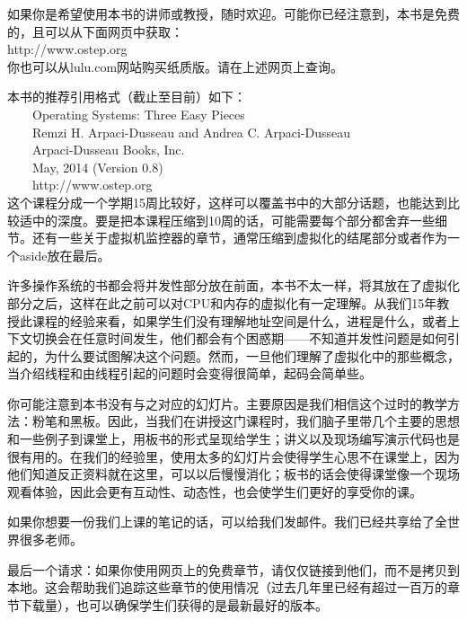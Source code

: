  \vspace*{0.0cm}
\thispagestyle{empty}
\centerline{}\vspace{2cm}

如果你是希望使用本书的讲师或教授，随时欢迎。可能你已经注意到，本书是免费的，且可以从下面网页中获取：\\
http://www.ostep.org\\
你也可以从lulu.com网站购买纸质版。请在上述网页上查询。

本书的推荐引用格式（截止至目前）如下：\\
~~~~Operating Systems: Three Easy Pieces\\
~~~~Remzi H. Arpaci-Dusseau and Andrea C. Arpaci-Dusseau\\
~~~~Arpaci-Dusseau Books, Inc.\\
~~~~May, 2014 (Version 0.8)\\
~~~~http://www.ostep.org\\

这个课程分成一个学期15周比较好，这样可以覆盖书中的大部分话题，也能达到比较适中的深度。要是把本课程压缩到10周的话，可能需要每个部分都舍弃一些细节。还有一些关于虚拟机监控器的章节，通常压缩到虚拟化的结尾部分或者作为一个aside放在最后。

许多操作系统的书都会将并发性部分放在前面，本书不太一样，将其放在了虚拟化部分之后，这样在此之前可以对CPU和内存的虚拟化有一定理解。从我们15年教授此课程的经验来看，如果学生们没有理解地址空间是什么，进程是什么，或者上下文切换会在任意时间发生，他们都会有个困惑期——不知道并发性问题是如何引起的，为什么要试图解决这个问题。然而，一旦他们理解了虚拟化中的那些概念，当介绍线程和由线程引起的问题时会变得很简单，起码会简单些。

你可能注意到本书没有与之对应的幻灯片。主要原因是我们相信这个过时的教学方法：粉笔和黑板。因此，当我们在讲授这门课程时，我们脑子里带几个主要的思想和一些例子到课堂上，用板书的形式呈现给学生；讲义以及现场编写演示代码也是很有用的。在我们的经验里，使用太多的幻灯片会使得学生心思不在课堂上，因为他们知道反正资料就在这里，可以以后慢慢消化；板书的话会使得课堂像一个现场观看体验，因此会更有互动性、动态性，也会使学生们更好的享受你的课。

如果你想要一份我们上课的笔记的话，可以给我们发邮件。我们已经共享给了全世界很多老师。

最后一个请求：如果你使用网页上的免费章节，请仅仅链接到他们，而不是拷贝到本地。这会帮助我们追踪这些章节的使用情况（过去几年里已经有超过一百万的章节下载量），也可以确保学生们获得的是最新最好的版本。
